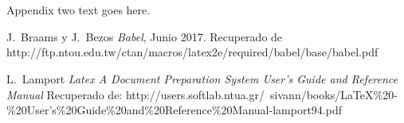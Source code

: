 \documentclass[10pt,journal,compsoc]{IEEEtran}
\begin{document}
\section{}
Appendix two text goes here.

\begin{thebibliography}{2}
	
	J.~Braams y J.~Bezos \emph{Babel}, Junio 2017. Recuperado de http://ftp.ntou.edu.tw/ctan/macros/latex2e/required/babel/base/babel.pdf  
	
	L.~Lamport \emph{Latex A Document Preparation System User's Guide and Reference Manual} Recuperado de:
	http://users.softlab.ntua.gr/~sivann/books/LaTeX\%20-\%20User's\%20Guide\%20and\%20Reference\%20Manual-lamport94.pdf
	
	
	
\end{thebibliography}
\end{document}
